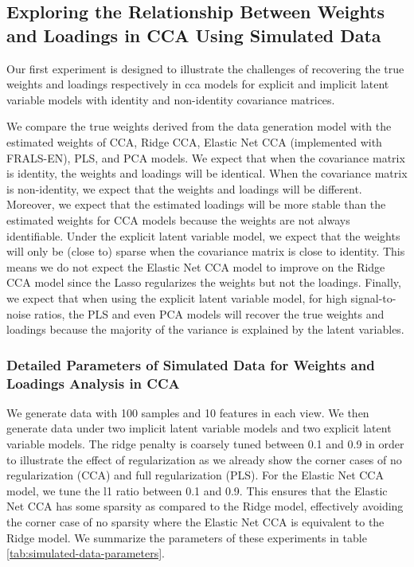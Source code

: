 \subsection{Exploring the Relationship Between Weights and Loadings in CCA Using Simulated Data}

Our first experiment is designed to illustrate the challenges of recovering the true weights and \gls{loadings} respectively in \acrshort{cca} models for explicit and implicit latent variable models with identity and non-identity covariance matrices.

We compare the true weights derived from the data generation model with the estimated weights of CCA, Ridge CCA, Elastic Net CCA (implemented with FRALS-EN), PLS, and PCA models.
We expect that when the covariance matrix is identity, the weights and \gls{loadings} will be identical.
When the covariance matrix is non-identity, we expect that the weights and \gls{loadings} will be different.
Moreover, we expect that the estimated loadings will be more stable than the estimated weights for CCA models because the weights are not always identifiable.
Under the explicit latent variable model, we expect that the weights will only be (close to) sparse when the covariance matrix is close to identity.
This means we do not expect the Elastic Net CCA model to improve on the Ridge CCA model since the Lasso regularizes the weights but not the \gls{loadings}.
Finally, we expect that when using the explicit latent variable model, for high signal-to-noise ratios, the PLS and even PCA models will recover the true weights and \gls{loadings} because the majority of the variance is explained by the latent variables.

\subsubsection{Detailed Parameters of Simulated Data for Weights and Loadings Analysis in CCA} We generate data with 100 samples and 10 features in each view.
We then generate data under two implicit latent variable models and two explicit latent variable models.
The ridge penalty is coarsely tuned between 0.1 and 0.9 in order to illustrate the effect of regularization as we already show the corner cases of no regularization (CCA) and full regularization (PLS).
For the Elastic Net CCA model, we tune the l1 ratio between 0.1 and 0.9. This ensures that the Elastic Net CCA has some sparsity as compared to the Ridge model, effectively avoiding the corner case of no sparsity where the Elastic Net CCA is equivalent to the Ridge model.
We summarize the parameters of these experiments in table \ref{tab:simulated-data-parameters}.


